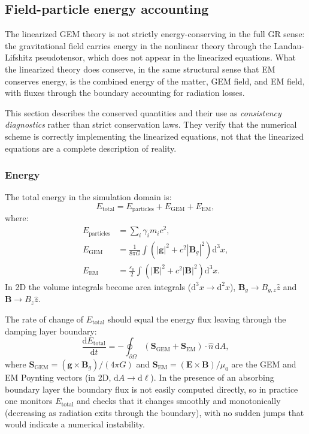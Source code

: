 \documentclass[11pt,a4paper]{article}
\newcommand{\vv}[1]{\mathbf{#1}}
\newcommand{\dd}{\mathrm{d}}
\begin{document}
\subsection{Field-particle energy accounting}
\label{sec:energy}

The linearized GEM theory is not strictly energy-conserving in the full GR sense: the gravitational field carries energy in the nonlinear theory through the Landau-Lifshitz pseudotensor, which does not appear in the linearized equations.  What the linearized theory does conserve, in the same structural sense that EM conserves energy, is the combined energy of the matter, GEM field, and EM field, with fluxes through the boundary accounting for radiation losses.

This section describes the conserved quantities and their use as \emph{consistency diagnostics} rather than strict conservation laws.  They verify that the numerical scheme is correctly implementing the linearized equations, not that the linearized equations are a complete description of reality.

\subsubsection*{Energy}

The total energy in the simulation domain is:
\begin{equation}
  E_{\mathrm{total}} = E_{\mathrm{particles}} + E_{\mathrm{GEM}} + E_{\mathrm{EM}},
\end{equation}
where:
\begin{align}
  E_{\mathrm{particles}} &= \sum_i \gamma_i m_i c^2, \\
  E_{\mathrm{GEM}}       &= \frac{1}{8\pi G}\int\!\!\left(|\vv{g}|^2 + c^2|\vv{B}_g|^2\right)\dd^3x, \\
  E_{\mathrm{EM}}        &= \frac{\varepsilon_0}{2}\int\!\!\left(|\vv{E}|^2 + c^2|\vv{B}|^2\right)\dd^3x.
\end{align}
In 2D the volume integrals become area integrals ($\dd^3x \to \dd^2x$), $\vv{B}_g \to B_{g,z}\hat{z}$ and $\vv{B} \to B_z\hat{z}$.

The rate of change of $E_{\mathrm{total}}$ should equal the energy flux leaving through the damping layer boundary:
\begin{equation}
  \frac{\dd E_{\mathrm{total}}}{\dd t} = -\oint_{\partial\Omega}(\vv{S}_{\mathrm{GEM}} + \vv{S}_{\mathrm{EM}})\cdot\hat{n}\,\dd A,
\end{equation}
where $\vv{S}_{\mathrm{GEM}} = (\vv{g}\times\vv{B}_g)/(4\pi G)$ and $\vv{S}_{\mathrm{EM}} = (\vv{E}\times\vv{B})/\mu_0$ are the GEM and EM Poynting vectors (in 2D, $\dd A \to \dd\ell$).  In the presence of an absorbing boundary layer the boundary flux is not easily computed directly, so in practice one monitors $E_{\mathrm{total}}$ and checks that it changes smoothly and monotonically (decreasing as radiation exits through the boundary), with no sudden jumps that would indicate a numerical instability.
\end{document}

